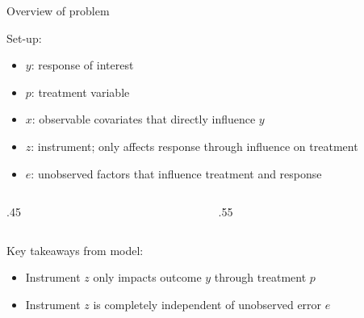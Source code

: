\documentclass[compress, 8pt]{beamer}
\begin{document}
\begin{frame}{Overview of problem}

Set-up:
\begin{itemize}
    \item $y$: response of interest
    \item $p$: treatment variable
    \item $x$: observable covariates that directly influence $y$
    \item $z$: instrument; only affects response through influence on treatment
    \item $e$: unobserved factors that influence treatment and response
\end{itemize}

\begin{columns}
\begin{column}{.45\textwidth}
\begin{figure}
\end{figure}
\end{column}
\begin{column}{.55\textwidth}
\begin{figure}
\end{figure}
\end{column}
\end{columns}

\vspace{3ex}
Key takeaways from model:
\begin{itemize}
    \item Instrument $z$ only impacts outcome $y$ through treatment $p$
    \item Instrument $z$ is completely independent of unobserved error $e$
\end{itemize}


\end{frame}
\end{document}
